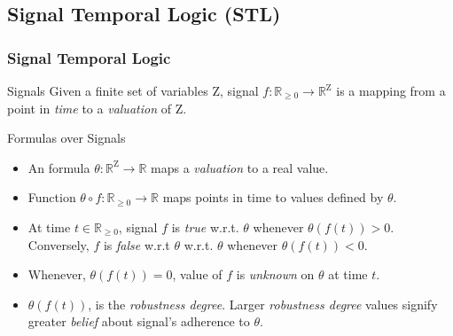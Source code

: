 \documentclass{beamer}
\newcommand{\typeTime}{\mathbb{R}_{\geq 0}}
\newcommand{\typeReal}{\mathbb{R}}
\newcommand{\Z}{\text{Z}}
\begin{document}
\subsection{Signal Temporal Logic (STL)}
\begin{frame}
    \frametitle{Signal Temporal Logic}
    \begin{block}{Signals}
        Given a finite set of variables $\Z$, signal
        $f : \typeTime \to \typeReal^{\Z}$ is a mapping
        from a point in \textit{time} to a \textit{valuation} of $\Z$.
    \end{block}
    \pause
    \begin{block}{Formulas over Signals}
        \begin{itemize}
            \item An formula $\theta : \typeReal^{\Z} \to \typeReal$
                  maps a \textit{valuation} to a real value.
            \item Function $\theta \circ f : \typeTime \to \typeReal$
                  maps points in time to values defined by $\theta$.
            \item At time $t \in \typeTime$, signal $f$ is \textit{true}
                w.r.t. $\theta$ whenever $\theta(f(t)) > 0 $.
                Conversely, $f$ is \textit{false} w.r.t $\theta$
                w.r.t. $\theta$ whenever $\theta(f(t)) < 0 $.
            \item Whenever, $\theta(f (t)) = 0$, value of $f$
                is \textit{unknown} on $\theta$ at time $t$.
            \item $\theta(f(t))$, is the \textit{robustness degree}.
                Larger \textit{robustness degree} values signify
                greater \textit{belief} about signal's adherence to $\theta$.
        \end{itemize}
    \end{block}
\end{frame}
\end{document}
